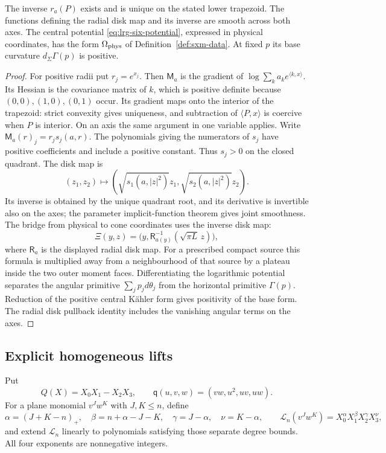 \begin{lemma}\label{lem:sxm-weights}
The inverse $r_a(P)$ exists and is unique on the stated lower trapezoid.
The functions defining the radial disk map and its inverse are smooth across both axes.
The central potential \eqref{eq:lrg-six-potential}, expressed in physical coordinates,
has the form $\Omega_{\rm phys}$ of Definition~\ref{def:sxm-data}.
At fixed $p$ its base curvature $d_\Sigma\Gamma(p)$ is positive.
\end{lemma}

\begin{proof}
For positive radii put $r_j=e^{x_j}$. Then $\mathsf M_a$ is the gradient of
$\log\sum_k a_ke^{\langle k,x\rangle}$.
Its Hessian is the covariance matrix of $k$, which is positive definite because
$(0,0),(1,0),(0,1)$ occur. Its gradient maps onto the interior of the trapezoid:
strict convexity gives uniqueness, and subtraction of $\langle P,x\rangle$ is
coercive when $P$ is interior. On an axis the same argument in one variable applies.
Write $\mathsf M_a(r)_j=r_j s_j(a,r)$. The polynomials giving the numerators of
$s_j$ have positive coefficients and include a positive constant. Thus $s_j>0$
on the closed quadrant. The disk map is
\[
 (z_1,z_2)\longmapsto(\sqrt{s_1(a,|z|^2)}z_1,
                            \sqrt{s_2(a,|z|^2)}z_2).
\]
Its inverse is obtained by the unique quadrant root, and its derivative is invertible
also on the axes; the parameter implicit-function theorem gives joint smoothness.
The bridge from physical to cone coordinates uses the inverse disk map:
\[
 \Xi(y,z)=\bigl(y,\mathsf R_{a(y)}^{-1}(\sqrt{\pi L}\,z)\bigr),
\]
where $\mathsf R_a$ is the displayed radial disk map. For a prescribed compact
source this formula is multiplied away from a neighbourhood of that source by
a plateau inside the two outer moment faces.
Differentiating the logarithmic potential separates the angular primitive
$\sum_j p_jd\theta_j$ from the horizontal primitive $\Gamma(p)$.
Reduction of the positive central Kähler form gives positivity of the base form.
The radial disk pullback identity includes the vanishing angular terms on the axes.
\end{proof}

\subsection{Explicit homogeneous lifts}\label{sec:sxm-lift}

Put
\[
 Q(X)=X_0X_1-X_2X_3,\qquad \mathsf q(u,v,w)=(vw,u^2,uv,uw).
\]
For a plane monomial $v^Jw^K$ with $J,K\le n$, define
\[
 \alpha=(J+K-n)_+,\quad \beta=n+\alpha-J-K,\quad
 \gamma=J-\alpha,\quad \nu=K-\alpha,
 \qquad \mathcal L_n(v^Jw^K)=X_0^\alpha X_1^\beta X_2^\gamma X_3^\nu,
\]
and extend $\mathcal L_n$ linearly to polynomials satisfying those separate degree
bounds. All four exponents are nonnegative integers.

